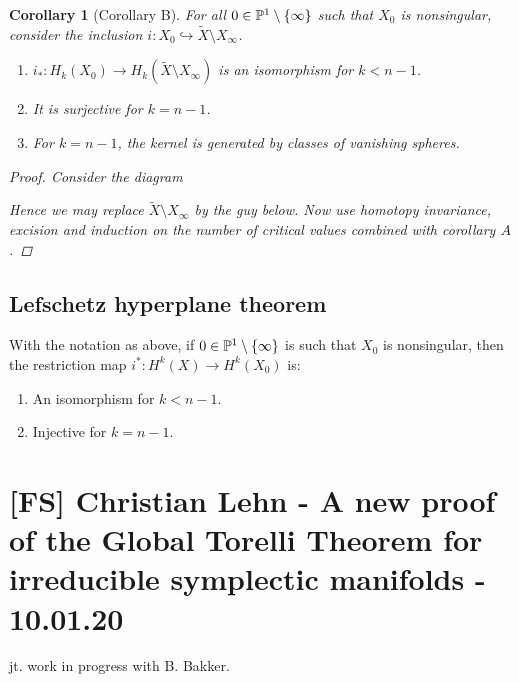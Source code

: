 \documentclass[A4paper, british, reqno]{amsart}
\theoremstyle{darkgreentheorem}
\newtheorem{cor}[thm]{Corollary}
\theoremstyle{darkbluedefinition}
\theoremstyle{darkredexample}
\theoremstyle{remark}
\newcommand{\1}{\mathbbm{1}}
\newcommand{\mono}{\hookrightarrow}
\begin{document}
\begin{cor}[Corollary B]
    For all $0\in \P^{1}\setminus \{\infty\}$ such that $X_{0}$ is nonsingular, consider the inclusion $i\colon X_{0}\mono \tilde{X}\setminus X_{\infty}$.
    \begin{enumerate}
	\item $i_{*}\colon H_{k}(X_{0})\to H_{k}(\tilde{X}\setminus X_{\infty})$ is an isomorphism for $k<n-1$.
	\item It is surjective for $k=n-1$.
	\item For $k=n-1$, the kernel is generated by classes of vanishing spheres.
    \end{enumerate}
    \begin{proof}
	Consider the diagram
	\begin{center}
	\end{center}
	Hence we may replace $\tilde{X}\setminus X_{\infty}$ by the guy below.
	Now use homotopy invariance, excision and induction on the number of critical values combined with corollary $A$.
    \end{proof}
\end{cor}


\subsection{Lefschetz hyperplane theorem}

With the notation as above, if $0\in \P^{1}\setminus\{\infty\}$ is such that $X_{0}$ is nonsingular, then the restriction map $i^{*}\colon H^{k}(X)\to H^{k}(X_{0})$ is:
\begin{enumerate}
    \item An isomorphism for $k<n-1$.
    \item Injective for $k=n-1$.
\end{enumerate}

\section{[FS] Christian Lehn - A new proof of the Global Torelli Theorem for irreducible symplectic manifolds - 10.01.20}

jt. work in progress with B. Bakker.
\end{document}
